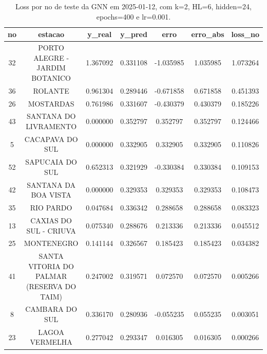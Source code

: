 \begin{table}[h]
\centering
\caption{Loss por no de teste da GNN em 2025-01-12, com k=2, HL=6, hidden=24, epochs=400 e lr=0.001.}
\label{tab:gnn_loss_k2_hl6_h24_e400_d20250112}
\begin{tabular}{ccccccc}
\toprule
no & estacao & y\_real & y\_pred & erro & erro\_abs & loss\_no \\
\midrule
32 & PORTO ALEGRE - JARDIM BOTANICO & 1.367092 & 0.331108 & -1.035985 & 1.035985 & 1.073264 \\
36 & ROLANTE & 0.961304 & 0.289446 & -0.671858 & 0.671858 & 0.451393 \\
26 & MOSTARDAS & 0.761986 & 0.331607 & -0.430379 & 0.430379 & 0.185226 \\
43 & SANTANA DO LIVRAMENTO & 0.000000 & 0.352797 & 0.352797 & 0.352797 & 0.124466 \\
5 & CACAPAVA DO SUL & 0.000000 & 0.332905 & 0.332905 & 0.332905 & 0.110826 \\
52 & SAPUCAIA DO SUL & 0.652313 & 0.321929 & -0.330384 & 0.330384 & 0.109153 \\
42 & SANTANA DA BOA VISTA & 0.000000 & 0.329353 & 0.329353 & 0.329353 & 0.108473 \\
35 & RIO PARDO & 0.047684 & 0.336342 & 0.288658 & 0.288658 & 0.083323 \\
13 & CAXIAS DO SUL - CRIUVA & 0.075340 & 0.288676 & 0.213336 & 0.213336 & 0.045512 \\
25 & MONTENEGRO & 0.141144 & 0.326567 & 0.185423 & 0.185423 & 0.034382 \\
41 & SANTA VITORIA DO PALMAR (RESERVA DO TAIM) & 0.247002 & 0.319571 & 0.072570 & 0.072570 & 0.005266 \\
8 & CAMBARA DO SUL & 0.336170 & 0.280936 & -0.055235 & 0.055235 & 0.003051 \\
23 & LAGOA VERMELHA & 0.277042 & 0.293347 & 0.016305 & 0.016305 & 0.000266 \\
\bottomrule
\end{tabular}
\end{table}
